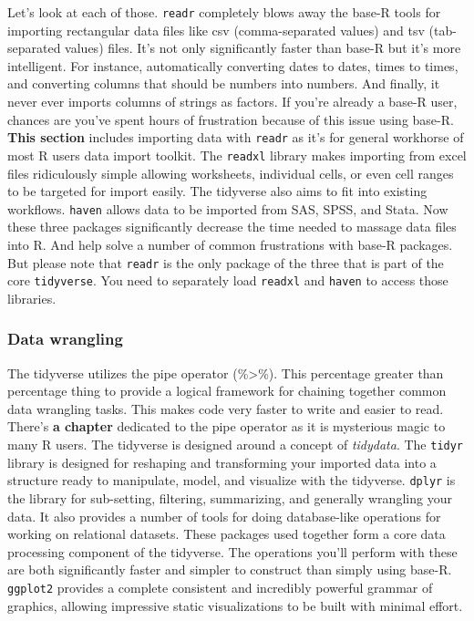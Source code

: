 \documentclass[
]{article}
\begin{document}
Let's look at each of those. \texttt{readr} completely blows away the base-R tools for importing rectangular data files like csv (comma-separated values) and tsv (tab-separated values) files. It's not only significantly faster than base-R but it's more intelligent. For instance, automatically converting dates to dates, times to times, and converting columns that should be numbers into numbers. And finally, it never ever imports columns of strings as factors. If you're already a base-R user, chances are you've spent hours of frustration because of this issue using base-R. \textbf{This section} includes importing data with \texttt{readr} as it's for general workhorse of most R users data import toolkit. The \texttt{readxl} library makes importing from excel files ridiculously simple allowing worksheets, individual cells, or even cell ranges to be targeted for import easily. The tidyverse also aims to fit into existing workflows. \texttt{haven} allows data to be imported from SAS, SPSS, and Stata. Now these three packages significantly decrease the time needed to massage data files into R. And help solve a number of common frustrations with base-R packages. But please note that \texttt{readr} is the only package of the three that is part of the core \texttt{tidyverse}. You need to separately load \texttt{readxl} and \texttt{haven} to access those libraries.

\hypertarget{data-wrangling}{%
\subsubsection{Data wrangling}\label{data-wrangling}}

The tidyverse utilizes the pipe operator (\%\textgreater\%). This percentage greater than percentage thing to provide a logical framework for chaining together common data wrangling tasks. This makes code very faster to write and easier to read. There's \textbf{a chapter} dedicated to the pipe operator as it is mysterious magic to many R users. The tidyverse is designed around a concept of \emph{tidydata}. The \texttt{tidyr} library is designed for reshaping and transforming your imported data into a structure ready to manipulate, model, and visualize with the tidyverse. \texttt{dplyr} is the library for sub-setting, filtering, summarizing, and generally wrangling your data. It also provides a number of tools for doing database-like operations for working on relational datasets. These packages used together form a core data processing component of the tidyverse. The operations you'll perform with these are both significantly faster and simpler to construct than simply using base-R. \texttt{ggplot2} provides a complete consistent and incredibly powerful grammar of graphics, allowing impressive static visualizations to be built with minimal effort.
\end{document}
